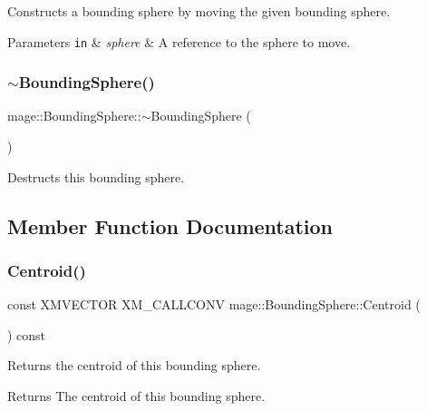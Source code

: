 Constructs a bounding sphere by moving the given bounding sphere.


\begin{DoxyParams}[1]{Parameters}
\mbox{\tt in}  & {\em sphere} & A reference to the sphere to move. \\
\hline
\end{DoxyParams}
\mbox{\label{classmage_1_1_bounding_sphere_af8c185ef441e95fd1f833e22fdee2bb3}} 
\subsubsection{\texorpdfstring{$\sim$\+Bounding\+Sphere()}{~BoundingSphere()}}
{\footnotesize\ttfamily mage\+::\+Bounding\+Sphere\+::$\sim$\+Bounding\+Sphere (\begin{DoxyParamCaption}{ }\end{DoxyParamCaption})\hspace{0.3cm}{\ttfamily [default]}}

Destructs this bounding sphere. 

\subsection{Member Function Documentation}
\mbox{\label{classmage_1_1_bounding_sphere_ae31660bd7333227d3f5e75b3243b8263}} 
\subsubsection{\texorpdfstring{Centroid()}{Centroid()}}
{\footnotesize\ttfamily const X\+M\+V\+E\+C\+T\+OR X\+M\+\_\+\+C\+A\+L\+L\+C\+O\+NV mage\+::\+Bounding\+Sphere\+::\+Centroid (\begin{DoxyParamCaption}{ }\end{DoxyParamCaption}) const\hspace{0.3cm}{\ttfamily [noexcept]}}

Returns the centroid of this bounding sphere.

\begin{DoxyReturn}{Returns}
The centroid of this bounding sphere. 
\end{DoxyReturn}
\mbox{\label{classmage_1_1_bounding_sphere_a7a6e27ec28a95caaef46f633b21af54e}} 
